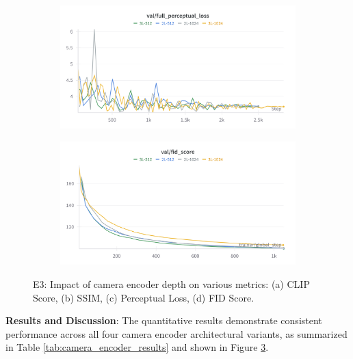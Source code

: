 \begin{figure}[htbp]
  \begin{subfigure}[b]{0.48\textwidth}
    \centering
    \includegraphics[width=\textwidth]{images/experiments/cam_depth/perceptual.png}
    \label{fig:exp_cam_depth_perceptual}
  \end{subfigure}
  \hfill
  \begin{subfigure}[b]{0.48\textwidth}
    \centering
    \includegraphics[width=\textwidth]{images/experiments/cam_depth/fid.png}
    \label{fig:exp_cam_depth_fid}
  \end{subfigure}

  \caption{E3: Impact of camera encoder depth on various metrics: (a) CLIP Score, (b) SSIM, (c) Perceptual Loss, (d) FID Score.}
  \label{fig:exp_cam_depth_metrics_grid}
\end{figure}

\textbf{Results and Discussion}:
The quantitative results demonstrate consistent performance across all four camera encoder architectural variants, as summarized in Table \ref{tab:camera_encoder_results} and shown in Figure \ref{fig:exp_cam_depth_metrics_grid}.

